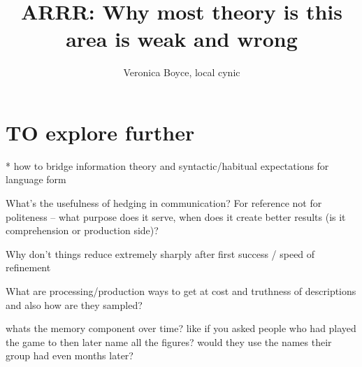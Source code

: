 \documentclass[]{article}
\title{ARRR: Why most theory is this area is weak and wrong}
\author{Veronica Boyce, local cynic}
\begin{document}
\maketitle


	


	

	

	

	

\section{TO explore further }

* how to bridge information theory and syntactic/habitual expectations for language form 

What's the usefulness of hedging in communication? For reference not for politeness -- what purpose does it serve, when does it create better results (is it comprehension or production side)? 

Why don't things reduce extremely sharply after first success / speed of refinement

What are processing/production ways to get at cost and truthness of descriptions and also how are they sampled? 

whats the memory component over time? like if you asked people who had played the game to then later name all the figures? would they use the names their group had even months later? 









\end{document}

